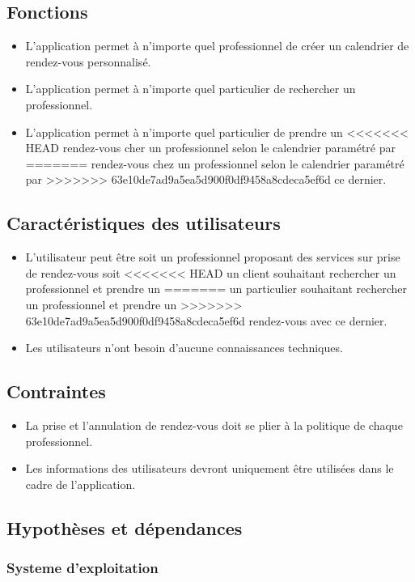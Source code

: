 \documentclass{article}
\begin{document}
\begin{itemize}
\subsection{Fonctions}
\begin{itemize}
\item L'application permet à n'importe quel professionnel de créer un
calendrier de rendez-vous personnalisé.
\item L'application permet à n'importe quel particulier de rechercher
  un professionnel.
\item L'application permet à n'importe quel particulier de prendre un
<<<<<<< HEAD
  rendez-vous cher un professionnel selon le calendrier paramétré par
=======
  rendez-vous chez un professionnel selon le calendrier paramétré par
>>>>>>> 63e10de7ad9a5ea5d900f0df9458a8cdeca5ef6d
  ce dernier.
\end{itemize}
\subsection{Caractéristiques des utilisateurs}
\begin{itemize}
\item L'utilisateur peut être soit un professionnel proposant des
  services sur prise de rendez-vous soit
<<<<<<< HEAD
  un client souhaitant rechercher un professionnel et prendre un
=======
  un particulier souhaitant rechercher un professionnel et prendre un
>>>>>>> 63e10de7ad9a5ea5d900f0df9458a8cdeca5ef6d
  rendez-vous avec ce dernier.
\item Les utilisateurs n'ont besoin d'aucune connaissances techniques.
\end{itemize}
\subsection{Contraintes}
\begin{itemize}
\item La prise et l'annulation de rendez-vous doit se plier à la
  politique de chaque professionnel.
\item Les informations des utilisateurs devront uniquement être
  utilisées dans le cadre de l'application.
\end{itemize}
\subsection{Hypothèses et dépendances}
\subsubsection{Systeme d'exploitation}

\end{itemize}
\end{document}
